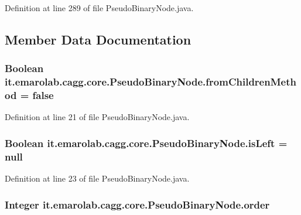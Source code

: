 Definition at line 289 of file Pseudo\-Binary\-Node.\-java.



\subsection{Member Data Documentation}
\hypertarget{classit_1_1emarolab_1_1cagg_1_1core_1_1PseudoBinaryNode_afea8e52970eabae6834b8b40154f86d7}{
\subsubsection[{from\-Children\-Method}]{\setlength{\rightskip}{0pt plus 5cm}Boolean it.\-emarolab.\-cagg.\-core.\-Pseudo\-Binary\-Node.\-from\-Children\-Method = false\hspace{0.3cm}{\ttfamily [private]}}}\label{classit_1_1emarolab_1_1cagg_1_1core_1_1PseudoBinaryNode_afea8e52970eabae6834b8b40154f86d7}


Definition at line 21 of file Pseudo\-Binary\-Node.\-java.

\hypertarget{classit_1_1emarolab_1_1cagg_1_1core_1_1PseudoBinaryNode_a76c03f21ae4fe91512c580ddd3ec18a1}{
\subsubsection[{is\-Left}]{\setlength{\rightskip}{0pt plus 5cm}Boolean it.\-emarolab.\-cagg.\-core.\-Pseudo\-Binary\-Node.\-is\-Left = null\hspace{0.3cm}{\ttfamily [private]}}}\label{classit_1_1emarolab_1_1cagg_1_1core_1_1PseudoBinaryNode_a76c03f21ae4fe91512c580ddd3ec18a1}


Definition at line 23 of file Pseudo\-Binary\-Node.\-java.

\hypertarget{classit_1_1emarolab_1_1cagg_1_1core_1_1PseudoBinaryNode_abde40bd33650d208fdfcdd9d68005ca7}{
\subsubsection[{order}]{\setlength{\rightskip}{0pt plus 5cm}Integer it.\-emarolab.\-cagg.\-core.\-Pseudo\-Binary\-Node.\-order\hspace{0.3cm}{\ttfamily [private]}}}\label{classit_1_1emarolab_1_1cagg_1_1core_1_1PseudoBinaryNode_abde40bd33650d208fdfcdd9d68005ca7}


